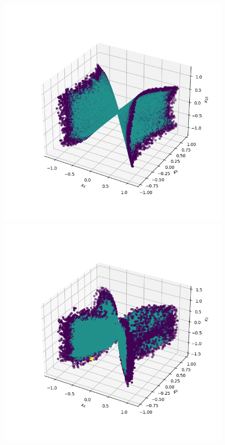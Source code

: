 \documentclass[11pt]{article}
\begin{document}
\begin{itemize}[label=\textbullet]
		\begin{figure}
			\centering
			\includegraphics[scale=0.4]{Figures/3d_plot_x4_x8_x10.png}
			\includegraphics[scale=0.4]{Figures/3d_plot_x2_x4_x8.png}

\end{figure}
\end{itemize}
\end{document}
